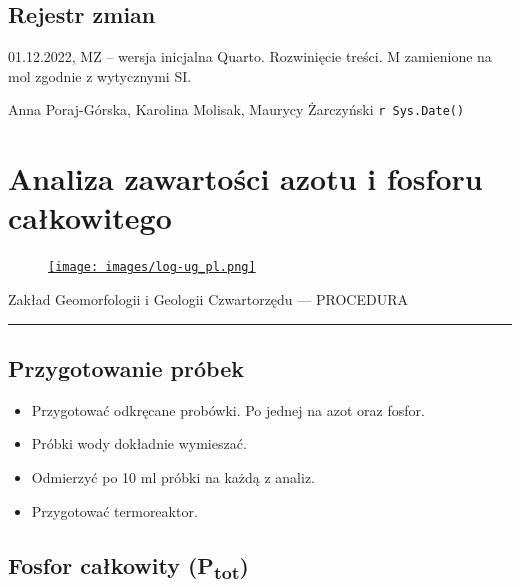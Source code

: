 \documentclass[
  letterpaper,
  DIV=11,
  numbers=noendperiod]{scrreprt}
\begin{document}
\hypertarget{rejestr-zmian-11}{%
\section{Rejestr zmian}\label{rejestr-zmian-11}}

01.12.2022, MZ -- wersja inicjalna Quarto. Rozwinięcie treści. M
zamienione na mol zgodnie z wytycznymi SI.

Anna Poraj-Górska, Karolina Molisak, Maurycy Żarczyński
\texttt{r\ Sys.Date()}

\hypertarget{analiza-zawartoux15bci-azotu-i-fosforu-caux142kowitego}{%
\chapter{Analiza zawartości azotu i fosforu
całkowitego}\label{analiza-zawartoux15bci-azotu-i-fosforu-caux142kowitego}}

\begin{figure}

\href{https://geomorfologia.ug.edu.pl}{\texttt{[image: images/log-ug\_pl.png]}}

\end{figure}

Zakład Geomorfologii i Geologii Czwartorzędu --- PROCEDURA

\begin{center}\rule{0.5\linewidth}{0.5pt}\end{center}

\hypertarget{przygotowanie-pruxf3bek}{%
\section{Przygotowanie próbek}\label{przygotowanie-pruxf3bek}}

\begin{itemize}
\item
  Przygotować odkręcane probówki. Po jednej na azot oraz fosfor.
\item
  Próbki wody dokładnie wymieszać.
\item
  Odmierzyć po 10 ml próbki na każdą z analiz.
\item
  Przygotować termoreaktor.
\end{itemize}

\hypertarget{fosfor-caux142kowity-ptot}{%
\section{\texorpdfstring{Fosfor całkowity
(P\textsubscript{tot})}{Fosfor całkowity (Ptot)}}\label{fosfor-caux142kowity-ptot}}
\end{document}
